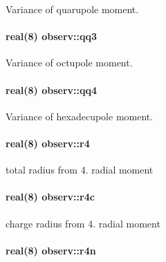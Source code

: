 Variance of quarupole moment. 

\paragraph[{\texorpdfstring{qq3}{qq3}}]{\setlength{\rightskip}{0pt plus 5cm}real(8) observ\+::qq3}\hypertarget{namespaceobserv_a1672ed9b98a4dab7a167d29620fba100}{}\label{namespaceobserv_a1672ed9b98a4dab7a167d29620fba100}


Variance of octupole moment. 

\paragraph[{\texorpdfstring{qq4}{qq4}}]{\setlength{\rightskip}{0pt plus 5cm}real(8) observ\+::qq4}\hypertarget{namespaceobserv_a9fc1bb5590ff288f6e8a0e89451cf805}{}\label{namespaceobserv_a9fc1bb5590ff288f6e8a0e89451cf805}


Variance of hexadecupole moment. 

\paragraph[{\texorpdfstring{r4}{r4}}]{\setlength{\rightskip}{0pt plus 5cm}real(8) observ\+::r4}\hypertarget{namespaceobserv_a763f74159ece0956ce250073d231cee7}{}\label{namespaceobserv_a763f74159ece0956ce250073d231cee7}


total radius from 4. radial moment 

\paragraph[{\texorpdfstring{r4c}{r4c}}]{\setlength{\rightskip}{0pt plus 5cm}real(8) observ\+::r4c}\hypertarget{namespaceobserv_a40affdee9346fd5b62a32dff19025a59}{}\label{namespaceobserv_a40affdee9346fd5b62a32dff19025a59}


charge radius from 4. radial moment 

\paragraph[{\texorpdfstring{r4n}{r4n}}]{\setlength{\rightskip}{0pt plus 5cm}real(8) observ\+::r4n}\hypertarget{namespaceobserv_a6e698cb41249db67aa98431cf2b5a4cd}{}\label{namespaceobserv_a6e698cb41249db67aa98431cf2b5a4cd}


